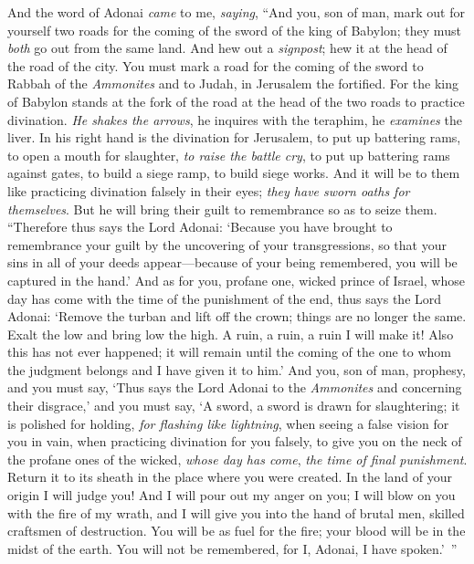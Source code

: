 \begin{biblechapter}
\verse And the word of Adonai \textit{came} to me, \textit{saying},
\verse “And you, son of man, mark out for yourself two roads for the coming of the sword of the king of Babylon; they must \textit{both} go out from the same land. And hew out a \textit{signpost}; hew it at the head of the road of the city.
\verse You must mark a road for the coming of the sword to Rabbah of the \textit{Ammonites} and to Judah, in Jerusalem the fortified.
\verse For the king of Babylon stands at the fork of the road at the head of the two roads to practice divination. \textit{He shakes the arrows}, he inquires with the teraphim, he \textit{examines} the liver.
\verse In his right hand is the divination for Jerusalem, to put up battering rams, to open a mouth for slaughter, \textit{to raise the battle cry}, to put up battering rams against gates, to build a siege ramp, to build siege works.
\verse And it will be to them like practicing divination falsely in their eyes; \textit{they have sworn oaths for themselves}. But he will bring their guilt to remembrance so as to seize them.
\verse “Therefore thus says the Lord Adonai: ‘Because you have brought to remembrance your guilt by the uncovering of your transgressions, so that your sins in all of your deeds appear—because of your being remembered, you will be captured in the hand.’
\verse And as for you, profane one, wicked prince of Israel, whose day has come with the time of the punishment of the end,
\verse thus says the Lord Adonai: ‘Remove the turban and lift off the crown; things are no longer the same. Exalt the low and bring low the high.
\verse A ruin, a ruin, a ruin I will make it! Also this has not ever happened; it will remain until the coming of the one to whom the judgment belongs and I have given it to him.’
\verse And you, son of man, prophesy, and you must say, ‘Thus says the Lord Adonai to the \textit{Ammonites} and concerning their disgrace,’ and you must say, ‘A sword, a sword is drawn for slaughtering; it is polished for holding, \textit{for flashing like lightning},
\verse when seeing a false vision for you in vain, when practicing divination for you falsely, to give you on the neck of the profane ones of the wicked, \textit{whose day has come}, \textit{the time of final punishment}.
\verse Return it to its sheath in the place where you were created. In the land of your origin I will judge you!
\verse And I will pour out my anger on you; I will blow on you with the fire of my wrath, and I will give you into the hand of brutal men, skilled craftsmen of destruction.
\verse You will be as fuel for the fire; your blood will be in the midst of the earth. You will not be remembered, for I, Adonai, I have spoken.’ ”
\end{biblechapter}

